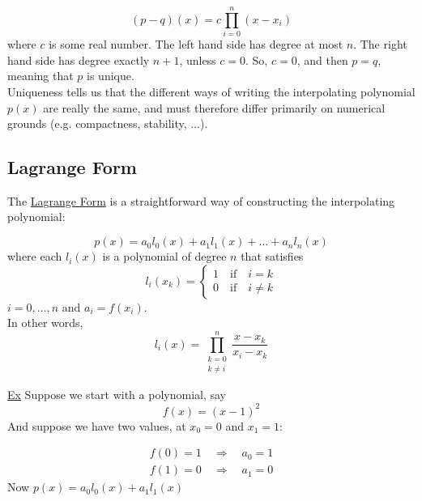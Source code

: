 \begin{equation*}
    (p-q)(x) = c \prod_{i=0}^n (x-x_i)
\end{equation*}
where $c$ is some real number. The left hand side has degree at most $n$. The right hand side has degree exactly $n+1$, unless $c=0$. So, $c=0$, and then $p=q$, meaning that $p$ is unique. \\

\noindent Uniqueness tells us that the different ways of writing the interpolating polynomial $p(x)$ are really the same, and must therefore differ primarily on numerical grounds (e.g. compactness, stability, ...). \\

\subsection{Lagrange Form}

\noindent The \underline{Lagrange Form} is a straightforward way of constructing the interpolating polynomial:

\begin{equation*}
    p(x) = a_0 l_0 (x) + a_1 l_1 (x) + \dots + a_n l_n (x)
\end{equation*}
where each $l_i(x)$ is a polynomial of degree $n$ that satisfies
\begin{equation*}
    l_i(x_k) = \begin{cases}
      1 \quad \mathrm{if} \quad i=k\\
      0 \quad \mathrm{if} \quad i \neq k
    \end{cases}  
\end{equation*}
$i=0,\dots,n$ and $a_i=f(x_i)$. \\

\noindent In other words,
\begin{equation*}
    l_i(x) = \prod_{\substack{k=0 \\ k\neq i}}^n \frac{x-x_k}{x_i-x_k}
\end{equation*}

\noindent \underline{Ex} Suppose we start with a polynomial, say 
\begin{equation*}
    f(x) = (x-1)^2
\end{equation*}
And suppose we have two values, at $x_0=0$ and $x_1 = 1$:

\begin{equation*}
    \begin{split}
        f(0)=1 \quad \Rightarrow \quad a_0 = 1 \\
        f(1)=0 \quad \Rightarrow \quad a_1 = 0
    \end{split}
\end{equation*}
Now $p(x) = a_0 l_0 (x) + a_1 l_1 (x)$ \\

